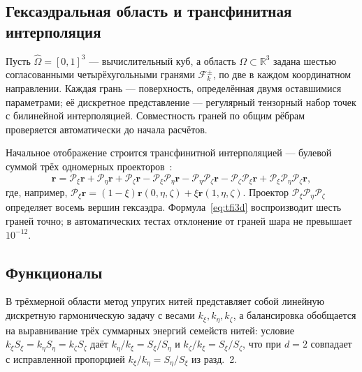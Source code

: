 \documentclass[11pt,a4paper]{article}
\newcommand{\vect}[1]{\boldsymbol{#1}}
\newcommand{\R}{\mathbb{R}}
\begin{document}
\subsection{Гексаэдральная область и трансфинитная интерполяция}

Пусть \(\widehat\Omega=[0,1]^3\) --- вычислительный куб, а область
\(\Omega\subset\R^3\) задана шестью согласованными четырёхугольными
гранями \(\mathcal F_k^\pm\), по две в каждом координатном направлении.
Каждая грань --- поверхность, определённая двумя оставшимися
параметрами; её дискретное представление --- регулярный тензорный
набор точек с билинейной интерполяцией. Совместность граней по общим
рёбрам проверяется автоматически до начала расчётов.

Начальное отображение строится трансфинитной интерполяцией --- булевой
суммой трёх одномерных проекторов~\cite{thompson1985,coons1967}:
\begin{equation}
\vect r=\mathcal P_\xi\vect r+\mathcal P_\eta\vect r+\mathcal P_\zeta\vect r
-\mathcal P_\xi\mathcal P_\eta\vect r
-\mathcal P_\eta\mathcal P_\zeta\vect r
-\mathcal P_\zeta\mathcal P_\xi\vect r
+\mathcal P_\xi\mathcal P_\eta\mathcal P_\zeta\vect r,
\label{eq:tfi3d}
\end{equation}
где, например,
\(\mathcal P_\xi\vect r=(1-\xi)\vect r(0,\eta,\zeta)+\xi\vect r(1,\eta,\zeta)\).
Проектор \(\mathcal P_\xi\mathcal P_\eta\mathcal P_\zeta\) определяет
восемь вершин гексаэдра. Формула~\eqref{eq:tfi3d} воспроизводит шесть
граней точно; в автоматических тестах отклонение от граней шара не
превышает \(10^{-12}\).

\subsection{Функционалы}

В трёхмерной области метод упругих нитей представляет собой линейную
дискретную гармоническую задачу с весами
\(k_\xi,k_\eta,k_\zeta\), а балансировка обобщается на выравнивание
трёх суммарных энергий семейств нитей: условие
\(k_\xi S_\xi=k_\eta S_\eta=k_\zeta S_\zeta\) даёт
\(k_\eta/k_\xi=S_\xi/S_\eta\) и \(k_\zeta/k_\xi=S_\xi/S_\zeta\), что при
\(d=2\) совпадает с исправленной пропорцией
\(k_\xi/k_\eta=S_\eta/S_\xi\) из разд.~2.
\end{document}
